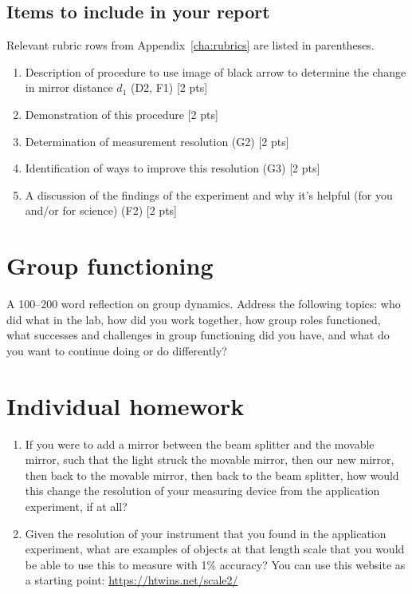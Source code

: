 \subsection{Items to include in your report}

Relevant rubric rows from Appendix~\ref{cha:rubrics} are listed in parentheses.

\begin{enumerate}
	\item Description of procedure to use image of black arrow to determine the change in mirror distance $d_1$ (D2, F1) [2 pts]
	\item Demonstration of this procedure [2 pts]
	\item Determination of measurement resolution (G2) [2 pts]
	\item Identification of ways to improve this resolution (G3) [2 pts]
	\item A discussion of the findings of the experiment and why it's helpful (for you and/or for science) (F2) [2 pts]
\end{enumerate}

\section{Group functioning}

\begin{steps}
	\item A 100--200 word reflection on group dynamics. Address the following topics: who did what in the lab, how did you work together, how group roles functioned, what successes and challenges in group functioning did you have, and what do you want to continue doing or do differently?
\end{steps}

\section{Individual homework}

\begin{enumerate}
	\item If you were to add a mirror between the beam splitter and the movable mirror, such that the light struck the movable mirror, then our new mirror, then back to the movable mirror, then back to the beam splitter, how would this change the resolution of your measuring device from the application experiment, if at all?
	
	\item Given the resolution of your instrument that you found in the application experiment, what are examples of objects at that length scale that you would be able to use this to measure with 1\% accuracy? You can use this website as a starting point: \url{https://htwins.net/scale2/}
\end{enumerate}